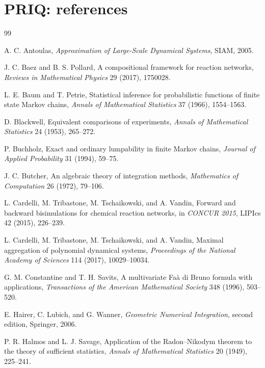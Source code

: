 \documentclass[11pt,oneside,openany]{book}
\numberwithin{equation}{section}
\begin{document}
\chapter{PRIQ: references}
\begin{thebibliography}{99}

A. C. Antoulas,
\emph{Approximation of Large-Scale Dynamical Systems},
SIAM, 2005.

J. C. Baez and B. S. Pollard,
A compositional framework for reaction networks,
\emph{Reviews in Mathematical Physics} 29 (2017), 1750028.

L. E. Baum and T. Petrie,
Statistical inference for probabilistic functions of finite state Markov chains,
\emph{Annals of Mathematical Statistics} 37 (1966), 1554--1563.

D. Blackwell,
Equivalent comparisons of experiments,
\emph{Annals of Mathematical Statistics} 24 (1953), 265--272.

P. Buchholz,
Exact and ordinary lumpability in finite Markov chains,
\emph{Journal of Applied Probability} 31 (1994), 59--75.

J. C. Butcher,
An algebraic theory of integration methods,
\emph{Mathematics of Computation} 26 (1972), 79--106.

L. Cardelli, M. Tribastone, M. Tschaikowski, and A. Vandin,
Forward and backward bisimulations for chemical reaction networks,
in \emph{CONCUR 2015}, LIPIcs 42 (2015), 226--239.

L. Cardelli, M. Tribastone, M. Tschaikowski, and A. Vandin,
Maximal aggregation of polynomial dynamical systems,
\emph{Proceedings of the National Academy of Sciences} 114 (2017), 10029--10034.

G. M. Constantine and T. H. Savits,
A multivariate Fa\`a di Bruno formula with applications,
\emph{Transactions of the American Mathematical Society} 348 (1996), 503--520.

E. Hairer, C. Lubich, and G. Wanner,
\emph{Geometric Numerical Integration}, second edition,
Springer, 2006.

P. R. Halmos and L. J. Savage,
Application of the Radon--Nikodym theorem to the theory of sufficient statistics,
\emph{Annals of Mathematical Statistics} 20 (1949), 225--241.


\end{thebibliography}
\end{document}
